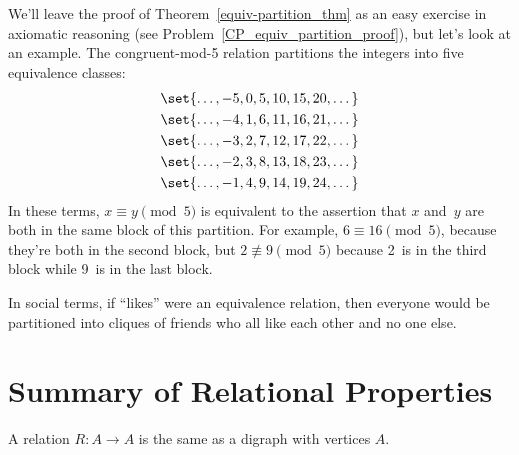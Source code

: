 We'll leave the proof of Theorem~\ref{equiv-partition_thm} as an easy
exercise in axiomatic reasoning (see
Problem~\ref{CP_equiv_partition_proof}), but let's look at an example.
The congruent-mod-5 relation partitions the integers into five
equivalence classes:
\begin{gather*}
    \set{ \dots, -5, 0, 5, 10, 15, 20, \dots } \\
    \set{ \dots, -4, 1, 6, 11, 16, 21, \dots } \\
    \set{ \dots, -3, 2, 7, 12, 17, 22, \dots } \\
    \set{ \dots, -2, 3, 8, 13, 18, 23, \dots } \\
    \set{ \dots, -1, 4, 9, 14, 19, 24, \dots }
\end{gather*}
In these terms, $x \equiv y \pmod{5}$ is equivalent to the assertion
that $x$ and~$y$ are both in the same block of this partition.  For
example, $6 \equiv 16 \pmod{5}$, because they're both in the second
block, but $2 \not\equiv 9 \pmod{5}$ because 2~is in the third block
while 9~is in the last block.

In social terms, if ``likes'' were an equivalence relation, then
everyone would be partitioned into cliques of friends who all like
each other and no one else.

\begin{problems}
\practiceproblems
{}

\classproblems
{}

\homeworkproblems
{}

\end{problems}

\section{Summary of Relational Properties}\label{prop_summary_sec}

A relation $R: A \to A$ is the same as a digraph with vertices $A$.

